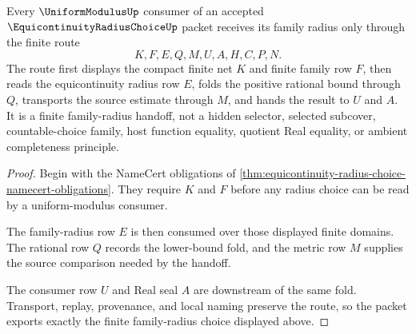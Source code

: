 \begin{theorem}
\label{thm:equicontinuity-radius-choice-finite-family-handoff}
Every $\UniformModulusUp$ consumer of an accepted $\EquicontinuityRadiusChoiceUp$ packet receives its family radius only through the finite route
$$
K,F,E,Q,M,U,A,H,C,P,N .
$$
The route first displays the compact finite net $K$ and finite family row $F$, then reads the equicontinuity radius row $E$, folds the positive rational bound through $Q$, transports the source estimate through $M$, and hands the result to $U$ and $A$. It is a finite family-radius handoff, not a hidden selector, selected subcover, countable-choice family, host function equality, quotient Real equality, or ambient completeness principle.
\end{theorem}
\begin{proof}
Begin with the NameCert obligations of \autoref{thm:equicontinuity-radius-choice-namecert-obligations}. They require $K$ and $F$ before any radius choice can be read by a uniform-modulus consumer.

The family-radius row $E$ is then consumed over those displayed finite domains. The rational row $Q$ records the lower-bound fold, and the metric row $M$ supplies the source comparison needed by the handoff.

The consumer row $U$ and Real seal $A$ are downstream of the same fold. Transport, replay, provenance, and local naming preserve the route, so the packet exports exactly the finite family-radius choice displayed above.
\end{proof}




